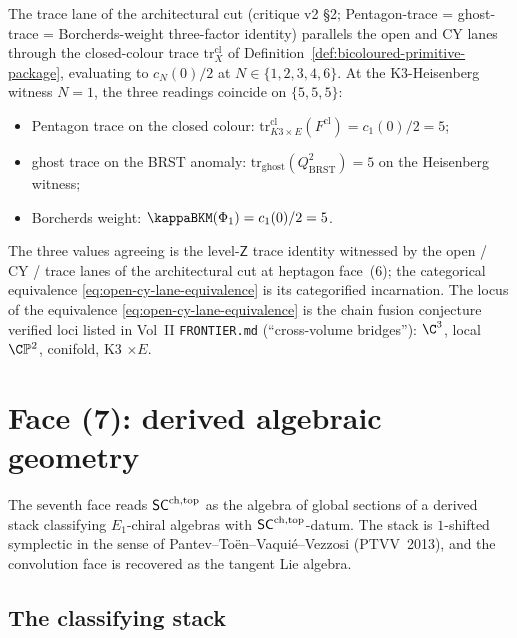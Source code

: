 \begin{remark}
\label{rem:three-lanes-face-6}
The trace lane of the architectural cut
\textup(critique v2 \S 2; Pentagon-trace = ghost-trace =
Borcherds-weight three-factor identity\textup) parallels the
open and CY lanes through the closed-colour trace
$\mathrm{tr}^{\mathrm{cl}}_X$ of
Definition~\ref{def:bicoloured-primitive-package}, evaluating to
$c_N(0)/2$ at $N \in \{1, 2, 3, 4, 6\}$. At the K3-Heisenberg
witness $N = 1$, the three readings coincide on
$\{5, 5, 5\}$:
\begin{itemize}
\item Pentagon trace on the closed colour:
$\mathrm{tr}^{\mathrm{cl}}_{K3 \times E}(F^{\mathrm{cl}}) = c_1(0)/2 = 5$;
\item ghost trace on the BRST anomaly:
$\mathrm{tr}_{\mathrm{ghost}}(Q_{\mathrm{BRST}}^2) = 5$ on the
Heisenberg witness;
\item Borcherds weight:
$\kappaBKM(\Phi_1) = c_1(0)/2 = 5$.
\end{itemize}
The three values agreeing is the level-$\mathsf{Z}$ trace identity
witnessed by the open / CY / trace lanes of the architectural cut at
heptagon face~(6); the categorical equivalence
\eqref{eq:open-cy-lane-equivalence} is its categorified incarnation.
The locus of the equivalence \eqref{eq:open-cy-lane-equivalence} is
the chain fusion conjecture verified loci listed in Vol~II
\texttt{FRONTIER.md} \textup(``cross-volume bridges''\textup):
$\C^3$, local $\C\mathbb{P}^2$, conifold, K3 $\times E$.
\end{remark}

\section{Face (7): derived algebraic geometry}
\label{sec:face-dag}

The seventh face reads $\mathsf{SC}^{\mathrm{ch},\mathrm{top}}$ as the algebra of global sections
of a derived stack classifying $E_1$-chiral algebras with
$\mathsf{SC}^{\mathrm{ch},\mathrm{top}}$-datum. The stack is $1$-shifted symplectic in the sense
of Pantev--To\"en--Vaqui\'e--Vezzosi (PTVV~2013), and the convolution
face is recovered as the tangent Lie algebra.

\subsection{The classifying stack}\label{subsec:classifying-stack}

